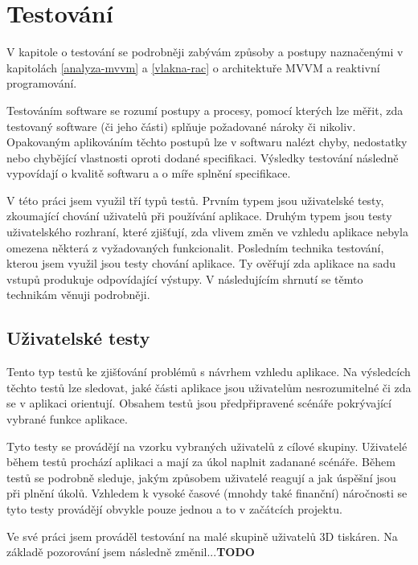 \chapter{Testování}\label{testovani}

V kapitole o testování se podrobněji zabývám způsoby a postupy naznačenými v kapitolách \ref{analyza-mvvm} a \ref{vlakna-rac} o architektuře MVVM a reaktivní programování.

Testováním software se rozumí postupy a procesy, pomocí kterých lze měřit, zda testovaný software (či jeho části) splňuje požadované nároky či nikoliv.
Opakovaným aplikováním těchto postupů lze v softwaru nalézt chyby, nedostatky nebo chybějící vlastnosti oproti dodané specifikaci.
Výsledky testování následně vypovídají o kvalitě softwaru a o míře splnění specifikace. \cite{software-testing-definition}

V této práci jsem využil tří typů testů.
Prvním typem jsou uživatelské testy, zkoumající chování uživatelů při používání aplikace.
Druhým typem jsou testy uživatelského rozhraní, které zjišťují, zda vlivem změn ve vzhledu aplikace nebyla omezena některá z vyžadovaných funkcionalit.
Posledním technika testování, kterou jsem využil jsou testy chování aplikace.
Ty ověřují zda aplikace na sadu vstupů produkuje odpovídající výstupy.
V následujícím shrnutí se těmto technikám věnuji podrobněji.

\section{Uživatelské testy}\label{testovani-ux}

Tento typ testů ke zjišťování problémů s návrhem vzhledu aplikace.
Na výsledcích těchto testů lze sledovat, jaké části aplikace jsou uživatelům nesrozumitelné či zda se v aplikaci orientují.
Obsahem testů jsou předpřipravené scénáře pokrývající vybrané funkce aplikace. \cite{dobry-web-ux-testing}

Tyto testy se provádějí na vzorku vybraných uživatelů z cílové skupiny.
Uživatelé během testů prochází aplikaci a mají za úkol naplnit zadanané scénáře.
Během testů se podrobně sleduje, jakým způsobem uživatelé reagují a jak úspěšní jsou při plnění úkolů.
Vzhledem k vysoké časové (mnohdy také finanční) náročnosti se tyto testy provádějí obvykle pouze jednou a to v začátcích projektu. \cite{h1-ux-testing}

Ve své práci jsem prováděl testování na malé skupině uživatelů 3D tiskáren.
Na základě pozorování jsem následně změnil...\textbf{TODO}

